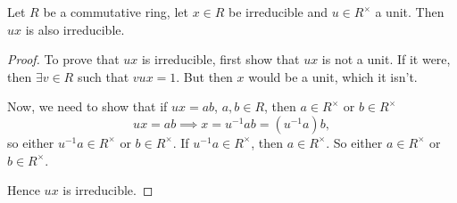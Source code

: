 \documentclass[10pt, a4paper]{article}
\begin{document}
\begin{lemma}\label{algII:lem:irredmulunitirred}
    Let $R$ be a commutative ring,
    let $x \in R$ be irreducible and $u \in R ^ {\times}$ a unit.
    Then $ux$ is also irreducible.

    \begin{proof}
        To prove that $ux$ is irreducible,
        first show that $ux$ is not a unit.
        If it were,
        then $\exists v \in R$ such that $vux = 1$.
        But then $x$ would be a unit,
        which it isn't.

        Now,
        we need to show that if $ux = ab$,
        $a, b \in R$,
        then $a \in R ^ {\times}$ or $b \in R ^ {\times}$
        \[
        ux = ab \implies x= u ^ {-1}ab = (u ^ {-1}a)b,
        \]
        so either $u ^ {-1}a \in R ^ {\times}$ or $b \in R ^ {\times}$.
        If $u ^ {-1}a \in R ^ {\times}$,
        then $a \in R ^ {\times}$.
        So either $a \in R ^ {\times}$ or $b \in R ^ {\times}$.

        Hence $ux$ is irreducible.
    \end{proof}
\end{lemma}
\end{document}
